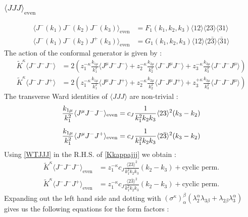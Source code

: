 \documentclass[a4paper,11pt]{article}
\begin{document}
\subsubsection*{$\langle JJJ \rangle_{\text{even}}$}\label{jjjevenansatz}
\begin{align}
\langle J^-(k_1) J^-(k_2)J^-(k_3) \rangle_{\text{even}} &=F_1(k_1, k_2, k_3)\langle 12 \rangle \langle 23 \rangle \langle 31 \rangle\\
\langle J^-(k_1) J^-(k_2)J^+(k_3) \rangle_{\text{even}} &=G_1(k_1, k_2, k_3)\langle 12 \rangle \langle 2\bar{3} \rangle \langle \bar{3}1 \rangle
\end{align}
The action of the conformal generator is given by :
\begin{align}\label{Kkappajjj}
\widetilde{K}^{\kappa} \langle J^- J^- J^- \rangle &= 2\left(z_1^{-\kappa}\frac{k_{1\mu}}{k_1^2}\langle J^{\mu} J^- J^- \rangle+z_2^{-\kappa}\frac{k_{2\mu}}{k_2^2}\langle J^- J^{\mu} J^- \rangle+z_3^{-\kappa}\frac{k_{3\mu}}{k_3^2}\langle J^- J^- J^{\mu} \rangle\right)\nonumber\\[5 pt]
\widetilde{K}^{\kappa} \langle J^- J^- J^+ \rangle &=2\left(z_1^{-\kappa}\frac{k_{1\mu}}{k_1^2}\langle J^{\mu} J^- J^+\rangle+z_2^{-\kappa}\frac{k_{2\mu}}{k_2^2}\langle J^- J^{\mu} J^+ \rangle+z_3^{+\kappa}\frac{k_{3\mu}}{k_3^2}\langle J^- J^- J^{\mu} \rangle\right)
\end{align}
The transverse Ward identities of $\langle JJJ\rangle$ \cite{Bzowski:2017poo} are non-trivial :
\begin{align}\label{WTJJJ}
    \frac{k_{1\mu}}{k_1^2}\langle J^{\mu} J^- J^- \rangle_{\text{even}}&= c_J\frac{1}{k_1^2 k_2 k_3}\langle 23 \rangle^2(k_3-k_2)\notag \\[5 pt]
    \frac{k_{1\mu}}{k_1^2}\langle J^{\mu} J^- J^+\rangle_{\text{even}}&= c_J\frac{1}{k_1^2 k_2 k_3}\langle 2\bar{3} \rangle^2(k_3-k_2)
    \end{align}
Using \eqref{WTJJJ} in the R.H.S. of \eqref{Kkappajjj} we obtain :
\begin{align}
\widetilde{K}^{\kappa} \langle J^- J^- J^- \rangle_{\text{even}} &= z_1^{-\kappa} c_J\frac{\langle 23 \rangle^2}{k_1^2 k_2 k_3}(k_2-k_3)+\text{cyclic perm.}\\[5 pt]
 \widetilde{K}^{\kappa} \langle J^- J^- J^+ \rangle_{\text{even}} &= z_1^{-\kappa}c_J\frac{\langle 2\bar{3} \rangle^2}{k_1^2 k_2 k_3}(k_2-k_3)+\text{cyclic perm.}
\end{align}
Expanding out the left hand side and dotting with $(\sigma^{\kappa})_{\alpha}^{\beta}(\lambda_2^{\alpha}\lambda_{3\beta}+\lambda_{2\beta}\lambda_3^{\alpha})$ gives us the following equations for the form factors :
\end{document}
